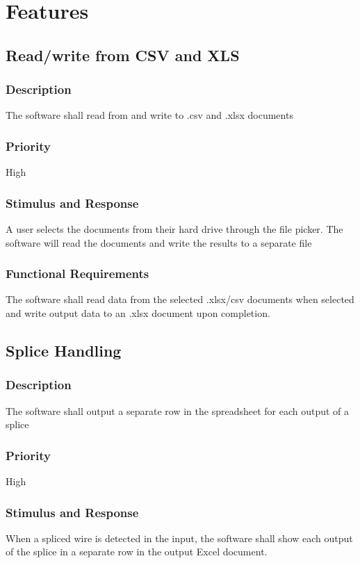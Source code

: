 \section{Features}

\subsection{Read/write from CSV and XLS}
\subsubsection{Description}
The software shall read from and write to .csv and .xlsx documents

\subsubsection{Priority}
High 

\subsubsection{Stimulus and Response}
 A user selects the documents from their hard drive through the file picker. The software will read the documents and write the results to a separate file

\subsubsection{Functional Requirements}
 
 The software shall read data from the selected .xlsx/csv documents when selected
 and write output data to an .xlsx document upon completion.
 
 \subsection{Splice Handling}
\subsubsection{Description}
 The software shall output a separate row in the spreadsheet for each output of a splice
\subsubsection{Priority}
High

\subsubsection{Stimulus and Response}
When a spliced wire is detected in the input, the software shall show each output of the splice in a separate row in the output Excel document.

